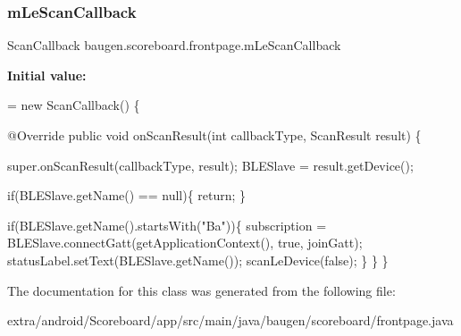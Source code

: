 \subsubsection{\texorpdfstring{m\+Le\+Scan\+Callback}{mLeScanCallback}}
{\footnotesize\ttfamily Scan\+Callback baugen.\+scoreboard.\+frontpage.\+m\+Le\+Scan\+Callback\hspace{0.3cm}{\ttfamily [private]}}

{\bfseries Initial value\+:}
\begin{DoxyCode}
= \textcolor{keyword}{new} ScanCallback() \{

        @Override
        \textcolor{keyword}{public} \textcolor{keywordtype}{void} onScanResult(\textcolor{keywordtype}{int} callbackType, ScanResult result) \{

            super.onScanResult(callbackType, result);
            BLESlave = result.getDevice();

            \textcolor{keywordflow}{if}(BLESlave.getName() == null)\{
                \textcolor{keywordflow}{return};
            \}

            
            
            \textcolor{keywordflow}{if}(BLESlave.getName().startsWith(\textcolor{stringliteral}{"Ba"}))\{
                subscription = BLESlave.connectGatt(getApplicationContext(), \textcolor{keyword}{true}, joinGatt);
                statusLabel.setText(BLESlave.getName());
                scanLeDevice(\textcolor{keyword}{false});
            \}
        \}
    \}
\end{DoxyCode}


The documentation for this class was generated from the following file\+:\begin{DoxyCompactItemize}
\item 
extra/android/\+Scoreboard/app/src/main/java/baugen/scoreboard/frontpage.\+java\end{DoxyCompactItemize}
